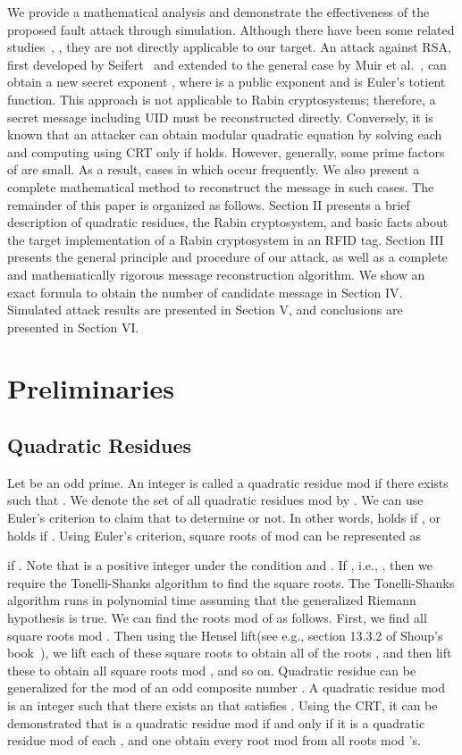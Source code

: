 \documentclass{article}
\begin{document}
We provide a mathematical analysis and 
demonstrate the effectiveness of the proposed fault attack through simulation.
Although there have been some related studies~\cite{Seifert}, \cite{Muir}, they 
are not directly applicable to our target.
An attack against RSA, first developed by Seifert~\cite{Seifert} and
extended to the general case by Muir et al.~\cite{Muir}, can obtain a new secret
exponent , where  is a public exponent and 
 is Euler's totient function. 
This approach is not applicable to Rabin cryptosystems; 
therefore, a secret message  including UID must be reconstructed directly.
Conversely, it is known that an attacker can obtain modular quadratic 
equation  by solving each  and
computing  using CRT only if  holds.
However, generally, 
some prime factors of  are small. 
As a result, cases in which  occur frequently. We also present a complete mathematical method to reconstruct the message in such cases. 
\medskip
The remainder of this paper is organized as follows. 
Section II presents a brief description of quadratic residues, 
the Rabin cryptosystem, and basic facts about the target implementation of a Rabin cryptosystem 
in an RFID tag.
Section III presents the general principle and procedure of our attack, 
as well as a complete and mathematically rigorous message reconstruction algorithm.
We show an exact formula to obtain the number of candidate message in Section IV. 
Simulated attack results are presented in Section V, and conclusions are presented in Section VI. 
\section{Preliminaries}
\subsection{Quadratic Residues}
Let  be an odd prime. 
An integer  is called a quadratic residue mod  if 
there exists  such that . 
We denote the set of all quadratic residues mod  by .
We can use 
Euler's criterion to claim that  
to determine  or not.
In other words,  holds if , or 
 holds if .
Using Euler's criterion, square roots of  mod  can be represented as 

if . 
Note that  is a positive integer under the condition 
and .
If , i.e., , 
then we require the Tonelli-Shanks algorithm to find the square roots. 
The Tonelli-Shanks algorithm runs in polynomial time 
assuming that the generalized Riemann hypothesis is true. 
We can find the roots mod  of  as follows. 
First, we find all square roots mod . 
Then using the Hensel lift(see e.g., section 13.3.2 of Shoup's book~\cite{Shoup}), we 
lift each of these square roots to obtain all of the roots , 
and then lift these to obtain all square roots 
mod , and so on.
Quadratic residue can be generalized for the mod of 
an odd composite number . 
A quadratic residue mod  is an integer  such that there exists an  
that satisfies . 
Using the CRT, it can be demonstrated that  is a quadratic residue mod  
if and only if it is a quadratic residue mod of each , and one obtain every root mod  
from all roots mod 's. 
\end{document}
